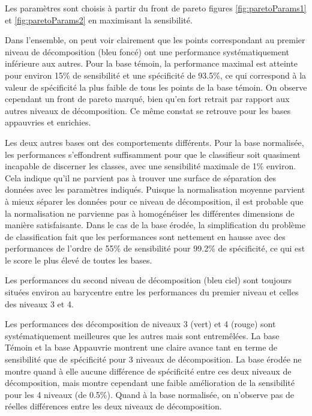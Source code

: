 Les paramètres sont choisis à partir du front de pareto figures \ref{fig:paretoParams1} et \ref{fig:paretoParams2} en maximisant la sensibilité.

Dans l'ensemble, on peut voir clairement que les points correspondant au premier niveau de décomposition (bleu foncé) ont une performance systématiquement inférieure aux autres. Pour la base témoin, la performance maximal est atteinte pour environ 15\% de sensibilité et une spécificité de 93.5\%, ce qui correspond à la valeur de spécificité la plus faible de tous les points de la base témoin. On observe cependant un front de pareto marqué, bien qu'en fort retrait par rapport aux autres niveaux de décomposition. Ce même constat se retrouve pour les bases appauvries et enrichies.

Les deux autres bases ont des comportements différents. Pour la base normalisée, les performances s'effondrent suffisamment pour que le classifieur soit quasiment incapable de discerner les classes, avec une sensibilité maximale de 1\% environ. Cela indique qu'il ne parvient pas à trouver une surface de séparation des données avec les paramètres indiqués. Puisque la normalisation moyenne parvient à mieux séparer les données pour ce niveau de décomposition, il est probable que la normalisation ne parvienne pas à homogénéiser les différentes dimensions de manière satisfaisante. Dans le cas de la base érodée, la simplification du problème de classification fait que les performances sont nettement en hausse avec des performances de l'ordre de 55\% de sensibilité pour 99.2\% de spécificité, ce qui est le score le plus élevé de toutes les bases.

Les performances du second niveau de décomposition (bleu ciel) sont toujours situées environ au barycentre entre les performances du premier niveau et celles des niveaux 3 et 4.

Les performances des décomposition de niveaux 3 (vert) et 4 (rouge) sont systématiquement meilleures que les autres mais sont entremêlées. La base Témoin et la base Appauvrie montrent une claire avance tant en terme de sensibilité que de spécificité pour 3 niveaux de décomposition. La base érodée ne montre quand à elle aucune différence de spécificité entre ces deux niveaux de décomposition, mais montre cependant une faible amélioration de la sensibilité pour les 4 niveaux (de 0.5\%). Quand à la base normalisée, on n'observe pas de réelles différences entre les deux niveaux de décomposition.

